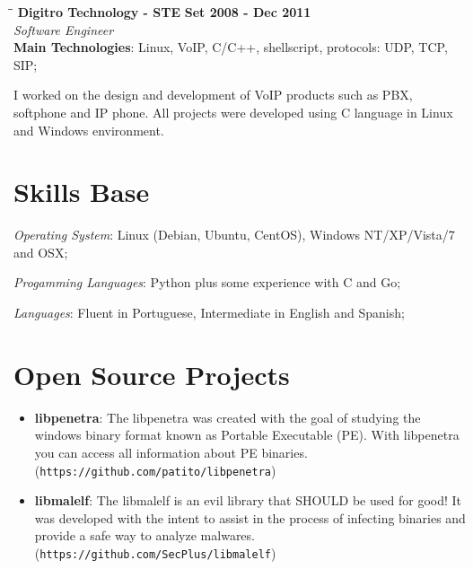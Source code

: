 \documentclass[margin]{res}
\begin{document}
\begin{resume}
   \begin{tabbing}
   \hspace{2.3in}\= \hspace{1.5in}\= \kill %
    \textbf{Digitro Technology - STE}    \>\>\textbf{Set 2008 - Dec 2011}\\
    \textit{Software Engineer}\\   
    \textbf{Main Technologies}: Linux, VoIP, C/C++, shellscript, protocols: UDP, TCP, SIP;
   \end{tabbing}\vspace{-20pt}      %
    \vspace{2mm}
    
    I worked on the design and development of VoIP products such as PBX, softphone and IP phone. 
    All projects were developed using C language in Linux and Windows environment.


\vspace{10mm}     

\section{Skills Base}  \textit{Operating System}:  Linux (Debian, Ubuntu, CentOS), Windows NT/XP/Vista/7 and OSX;
  
			\textit{Progamming Languages}: Python plus some experience with C and Go;
  
			\textit{Languages}: Fluent in Portuguese, Intermediate in English and Spanish;

\section{Open Source Projects}
		\begin{itemize}
		    \vspace{2mm}
		    \item \textbf{libpenetra}: The libpenetra was created with the goal of studying the windows binary format 
		                               known as Portable Executable (PE). With libpenetra you can access all information
		                               about PE binaries. (\texttt{https://github.com/patito/libpenetra}) \vspace{1mm}
		                               
		    \item \textbf{libmalelf}: The libmalelf is an evil library that SHOULD be used for good! It was developed
		                              with the intent to assist in the process of infecting binaries and provide a safe 
		                              way to analyze malwares. (\texttt{https://github.com/SecPlus/libmalelf})\vspace{1mm}
		                              

\end{itemize}
\end{resume}
\end{document}
